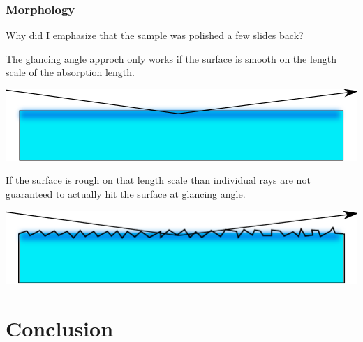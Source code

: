 \documentclass[10pt, xcolor=x11names, compress]{beamer}
\begin{document}
\begin{frame}
  \frametitle{Morphology}
  \begin{exampleblock}{}
    Why did I emphasize that the sample was polished a few slides back?
  \end{exampleblock}

  The glancing angle approch only works if the surface is smooth on
  the length scale of the absorption length.
  \begin{center}
    \includegraphics[width=0.8\linewidth]{images/smooth.pdf}
  \end{center}

  If the surface is rough on that length scale than individual rays
  are not guaranteed to actually hit the surface at glancing angle.
  \begin{center}
    \includegraphics[width=0.8\linewidth]{images/rough.pdf}
  \end{center}


\end{frame}

\section{Conclusion}
\end{document}
